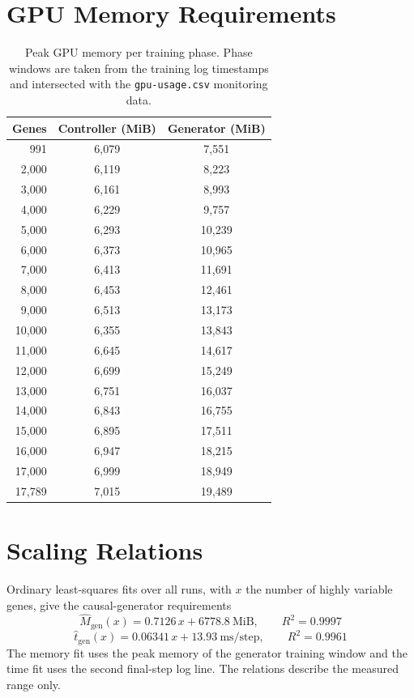 \documentclass[11pt]{article}
\begin{document}
\section{GPU Memory Requirements}
\begin{table}[H]
\centering
\small
\caption{Peak GPU memory per training phase. Phase windows are taken from the training log timestamps and intersected with the \texttt{gpu-usage.csv} monitoring data.}
\label{tab:memory}
\begin{tabular}{rcc}
\toprule
Genes & Controller (MiB) & Generator (MiB) \\
\midrule
991 & 6,079 & 7,551\\
2,000 & 6,119 & 8,223\\
3,000 & 6,161 & 8,993\\
4,000 & 6,229 & 9,757\\
5,000 & 6,293 & 10,239\\
6,000 & 6,373 & 10,965\\
7,000 & 6,413 & 11,691\\
8,000 & 6,453 & 12,461\\
9,000 & 6,513 & 13,173\\
10,000 & 6,355 & 13,843\\
11,000 & 6,645 & 14,617\\
12,000 & 6,699 & 15,249\\
13,000 & 6,751 & 16,037\\
14,000 & 6,843 & 16,755\\
15,000 & 6,895 & 17,511\\
16,000 & 6,947 & 18,215\\
17,000 & 6,999 & 18,949\\
17,789 & 7,015 & 19,489\\
\bottomrule
\end{tabular}
\end{table}

\section{Scaling Relations}
Ordinary least-squares fits over all runs, with $x$ the number of highly variable genes,
give the causal-generator requirements
\begin{equation}
\widehat{M}_{\mathrm{gen}}(x) = 0.7126\,x + 6778.8\ \mathrm{MiB},\qquad R^2 = 0.9997
\end{equation}
\begin{equation}
\widehat{t}_{\mathrm{gen}}(x) = 0.06341\,x + 13.93\ \mathrm{ms/step},\qquad R^2 = 0.9961
\end{equation}
The memory fit uses the peak memory of the generator training window and the time fit uses the second final-step log line. The relations describe the measured range only.
\end{document}
